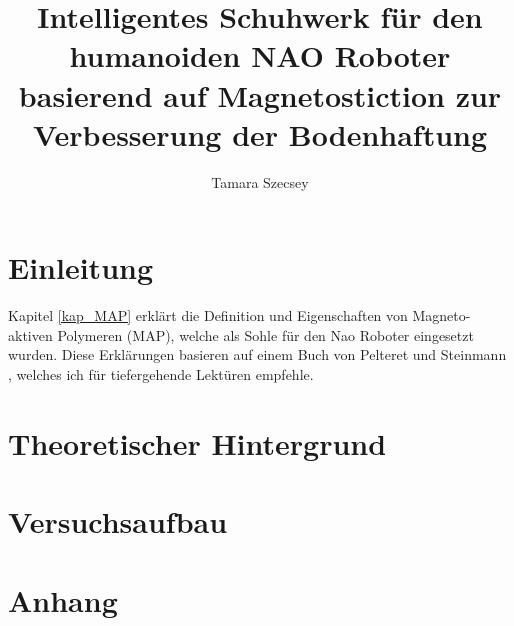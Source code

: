 \documentclass[a4paper,
DIV=13,
12pt,
BCOR=10mm,
department=FakEI,
oneside,
parskip=half,
automark,
]{OTHRartcl}
\title{Intelligentes Schuhwerk für den humanoiden NAO Roboter basierend auf Magnetostiction zur Verbesserung der Bodenhaftung}
\author{Tamara Szecsey}
\begin{document}
\maketitle
\makedeclaration

\thispagestyle{empty}
\tableofcontents	
\clearpage	
\setcounter{page}{1}

\section{Einleitung}
%
Kapitel \ref{kap_MAP} erklärt die Definition und Eigenschaften von Magneto-aktiven Polymeren (MAP), welche als Sohle für den Nao Roboter eingesetzt wurden. Diese Erklärungen basieren auf einem Buch von Pelteret und Steinmann \cite{map2020}, welches ich für tiefergehende Lektüren empfehle. 
\newpage
\section{Theoretischer Hintergrund}

\newpage
\section{Versuchsaufbau}

%
%
%

%

%
%
%
\newpage
\section{Anhang} \label{Anhang}


\FloatBarrier
\newpage
\clearpage	
\printbibliography
\end{document}
